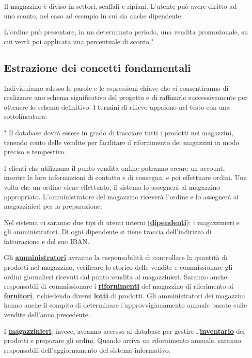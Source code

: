 Il magazzino è diviso in settori, scaffali e ripiani.
L'utente può avere diritto ad uno sconto, nel caso ad esempio in cui sia anche dipendente.

L'ordine può presentare, in un determinato periodo, una vendita promozionale, su cui verrà poi applicata una percentuale di sconto."

\newpage
\subsection{Estrazione dei concetti fondamentali}
Individuiamo adesso le parole e le espressioni chiave che ci consentiranno di realizzare uno schema significativo del progetto e di raffinarlo successivamente per ottenere lo schema definitivo. I termini di
rilievo appaiono nel testo con una sottolineatura:

"
Il database dovrà essere in grado di tracciare tutti i prodotti nei magazzini, tenendo conto delle vendite per facilitare il rifornimento dei magazzini in modo preciso e tempestivo.

I clienti che utilizzano il punto vendita online potranno creare un account, inserire le loro informazioni di contatto e di consegna, e poi effettuare ordini. Una volta che un ordine viene effettuato, il sistema lo assegnerà al magazzino appropriato. L'amministratore del magazzino riceverà l'ordine e lo assegnerà ai magazzinieri per la preparazione. 

Nel sistema ci saranno due tipi di utenti interni (\textbf{\underline{dipendenti}}): i magazzinieri e gli amministratori.
Di ogni dipendente si tiene traccia dell'indirizzo di fatturazione e del suo IBAN.

Gli \textbf{\underline{amministratori}} avranno la responsabilità di controllare la quantità di prodotti nel magazzino, verificare lo storico delle vendite e commissionare gli ordini giornalieri ricevuti dal punto vendita ai magazzinieri. Saranno anche responsabili di commissionare i \textbf{\underline{rifornimenti}} del magazzino di riferimento ai \textbf{\underline{fornitori}}, richiedendo diversi \textbf{\underline{lotti}} di prodotti.
Gli amministratori dei magazzini hanno anche il compito di determinare l'approvvigionamento annuale basato sulle vendite dell'anno precedente.

I \textbf{\underline{magazzinieri}}, invece, avranno accesso al database per gestire l'\textbf{\underline{inventario}} dei prodotti e preparare gli ordini. 
Quando arriva un rifornimento annuale, saranno responsabili dell'aggiornamento del sistema informativo.

